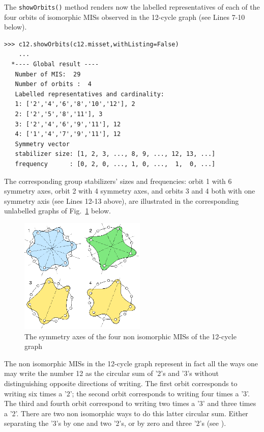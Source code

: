 The \texttt{showOrbits()} method renders now the labelled representatives of each of the four orbits of isomorphic MISs observed in the 12-cycle graph (see Lines 7-10 below).
\begin{lstlisting}
>>> c12.showOrbits(c12.misset,withListing=False)
    ...
  *---- Global result ----
   Number of MIS:  29
   Number of orbits :  4
   Labelled representatives and cardinality:
   1: ['2','4','6','8','10','12'], 2
   2: ['2','5','8','11'], 3
   3: ['2','4','6','9','11'], 12
   4: ['1','4','7','9','11'], 12
   Symmetry vector
   stabilizer size: [1, 2, 3, ..., 8, 9, ..., 12, 13, ...]
   frequency      : [0, 2, 0, ..., 1, 0, ...,  1,  0, ...]
\end{lstlisting}
The corresponding group stabilizers' sizes and frequencies: orbit 1 with 6 symmetry axes, orbit 2 with 4 symmetry axes, and orbits 3 and 4 both with one symmetry axis (see Lines 12-13 above), are illustrated in the corresponding unlabelled graphs of Fig.~\ref{fig:21.7.2} below.
\begin{figure}[h]
\sidecaption[t]
\includegraphics[width=6cm]{Figures/c12.png}
\caption{The symmetry axes of the four non isomorphic MISs of the 12-cycle graph} 
\label{fig:21.7.2}       %
\end{figure}

The non isomorphic MISs in the 12-cycle graph represent in fact all the ways one may write the number 12 as the circular sum of '2's and '3's without distinguishing opposite directions of writing. The first orbit corresponds to writing six times a '2'; the second orbit corresponds to writing four times a '3'. The third and fourth orbit correspond to writing two times a '3' and three times a '2'. There are two non isomorphic ways to do this latter circular sum. Either separating the '3's by one and two '2's, or by zero and three '2's (see \citep{ISOMIS-08}).


\clearpage

\typeout{}

%